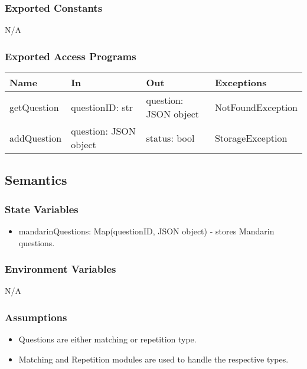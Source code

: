 \documentclass[12pt, titlepage]{article}
\begin{document}
\subsubsection{Exported Constants}

N/A

\subsubsection{Exported Access Programs}

\begin{center}
\begin{tabular}{p{3cm} p{4cm} p{4cm} p{5cm}}
\hline
\textbf{Name} & \textbf{In} & \textbf{Out} & \textbf{Exceptions} \\
\hline
getQuestion & \raggedright\arraybackslash questionID: str & \raggedright\arraybackslash question: JSON object & \raggedright\arraybackslash NotFoundException \\
\hline
addQuestion & \raggedright\arraybackslash question: JSON object & \raggedright\arraybackslash status: bool & \raggedright\arraybackslash StorageException \\
\hline
\end{tabular}
\end{center}

\subsection{Semantics}

\subsubsection{State Variables}

\begin{itemize}
  \item mandarinQuestions: Map(questionID, JSON object) - stores Mandarin questions.
\end{itemize}

\subsubsection{Environment Variables}

N/A

\subsubsection{Assumptions}

\begin{itemize}
  \item Questions are either matching or repetition type.
  \item Matching and Repetition modules are used to handle the respective types.
\end{itemize}
\end{document}
